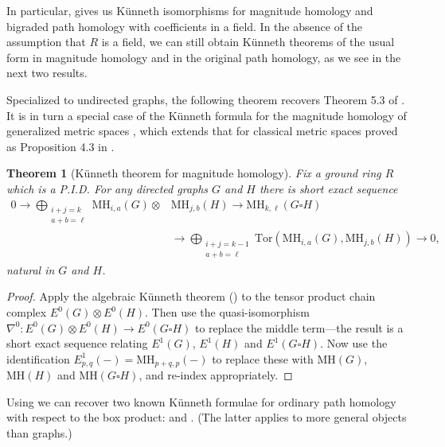 \documentclass[a4paper, 11 pt, oneside, reqno]{amsart}
\numberwithin{lemma}{section}
\newtheorem{theorem}[lemma]{Theorem}
\theoremstyle{definition}
\newcommand{\MH}{\mathrm{MH}}
\begin{document}
In particular,  gives us K\"unneth isomorphisms
for magnitude homology and bigraded path homology with 
coefficients in a field.
In the absence of the assumption that $R$ is a field,
we can still obtain K\"unneth theorems of the usual
form in magnitude homology and in the original
path homology, as we see in the next two results.

Specialized to undirected graphs, the following theorem recovers Theorem 5.3 of \cite{HepworthWillerton2017}. It is in turn a special case of the K\"unneth formula for the magnitude homology of generalized metric spaces \cite[Theorem 4.6]{Roff2023}, which extends that for classical metric spaces proved as Proposition 4.3 in \cite{BottinelliKaiser2021}.

\begin{theorem}[K\"unneth theorem for magnitude homology]
\label{thm:kunneth_box_MH}
Fix a ground ring \(R\) which is a P.I.D. For any directed graphs \(G\) and \(H\) there is short exact sequence
    \begin{equation}
    \label{eq:SES_MH}
    \begin{split}
    0 \to \bigoplus_{\substack{i+j=k \\a+b=\ell}} \MH_{i,a}(G) \otimes & \MH_{j,b}(H) \to \MH_{k,\ell}(G \square H) \\
    & \to \bigoplus_{\substack{i+j=k-1 \\a+b=\ell}} \mathrm{Tor}(\MH_{i,a}(G),\MH_{j,b}(H)) \to 0,
    \end{split}
    \end{equation}
natural in \(G\) and \(H\).
\end{theorem}

\begin{proof}
Apply the algebraic K\"unneth theorem ()
to the tensor product chain complex $E^0(G)\otimes E^0(H)$.
Then use the quasi-isomorphism 
$\nabla^0\colon E^0(G)\otimes E^0(H)
\to E^0(G\square H)$ to replace the middle term---the result is a short exact sequence relating
$E^1(G)$, $E^1(H)$ and $E^1(G\square H)$.
Now use the identification $E_{p,q}^1(-) = \MH_{p+q,p}(-)$ 
to replace these with $\MH(G)$, $\MH(H)$ and $\MH(G\square H)$, and re-index appropriately.
\end{proof}

Using  we can recover two known K\"unneth formulae for ordinary path homology with respect to the box product: \cite[Theorem 4.7]{PH-kunneth} and \cite[Theorem 9.5]{IvanovPav2022}. (The latter applies to more general objects than graphs.)
\end{document}
